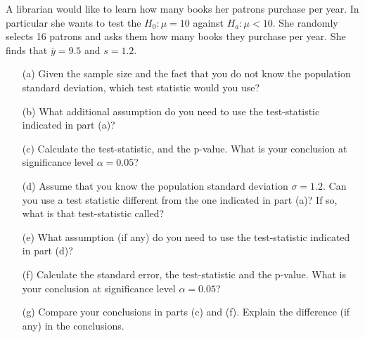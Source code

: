 \documentclass[12pt,letterpaper]{article}
\begin{document}
\noindent A librarian would like to learn how many books her patrons purchase per year. In particular she wants to test the $H_0:\mu=10$ against $H_a:\mu<10$. She randomly selects 16 patrons and asks them how many books they purchase per year. She finds that $\bar y=9.5$ and $s=1.2$.
	
	\begin{itemize}
		\item[(a)] Given the sample size and the fact that you do not know the population standard deviation, which test statistic would you use? \\
		\vspace{11em}
		
		\item[(b)] What additional assumption do you need to use the test-statistic indicated in part (a)?\\
		\vspace{11em}
		
		
		\item[(c)] Calculate the test-statistic, and the p-value. What is your conclusion at significance level $\alpha=0.05$?\\
		\vspace{11em}
		
		\item[(d)] Assume that you know the population standard deviation $\sigma=1.2$. Can you use a test statistic different from the one indicated in part (a)? If so, what is that test-statistic called?\\
		\vspace{11em}
		
		
		\item[(e)] What assumption (if any) do you need to use the test-statistic indicated in part (d)?\\
		\vspace{11em}
		
		
		\item[(f)] Calculate the standard error, the test-statistic and the p-value. What is your conclusion at significance level $\alpha=0.05$?\\
		\vspace{11em}
		
		
		\item[(g)] Compare your conclusions in parts (c) and (f). Explain the difference (if any) in the conclusions.
		
	\end{itemize}
		\vspace{7em}
	
\end{document}
